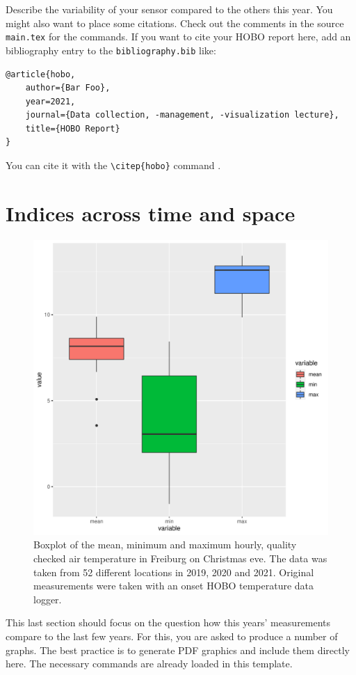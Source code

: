 \documentclass[11pt]{scrartcl}
\newcommand\wordcount[1]{
    \immediate\write18{texcount -sum=[1,0,0] -sub=section #1.tex  | grep "Section" | sed -e 's/+.*//' | sed -n \thesection p > ./\jobname-words.sum}%
    \medskip\par words
}
\begin{document}
Describe the variability of your sensor compared to the others this year. 
You might also want to place some citations. Check out the comments in the source 
\texttt{main.tex} for the commands. 
If you want to cite your HOBO report here, add an bibliography entry to the \texttt{bibliography.bib} like:

\begin{verbatim}
@article{hobo,
    author={Bar Foo},
    year=2021,
    journal={Data collection, -management, -visualization lecture},
    title={HOBO Report}
}
\end{verbatim}

You can cite it with the \texttt{\textbackslash citep\{hobo\}} command \citep{hobo}.



\section{Indices across time and space}

\begin{figure}[ht]
    \centering
    \includegraphics[width=.5\textwidth]{./figures/example_analysis}
    \caption{Boxplot of the mean, minimum and maximum hourly, quality checked air temperature in Freiburg on Christmas eve. The data was taken from 52 different locations in 2019, 2020 and 2021. Original measurements were taken with an onset HOBO temperature data logger.}
    \label{fig:first_figure}
\end{figure}

This last section should focus on the question how this years' measurements compare 
to the last few years. For this, you are asked to produce a number of graphs. 
The best practice is to generate PDF graphics and include them directly here.
The necessary commands are already loaded in this template.
\end{document}
